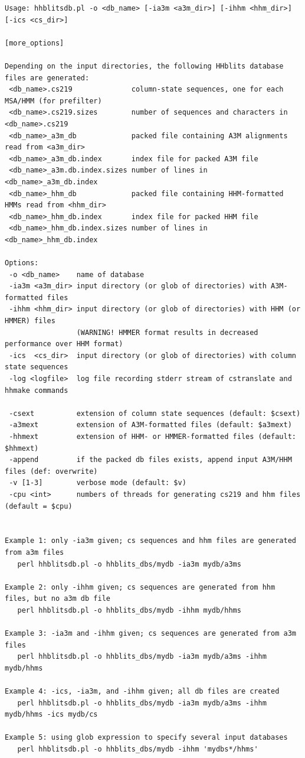 \documentclass[11pt,a4paper]{article}
\begin{document}
\small 
\begin{verbatim}
Usage: hhblitsdb.pl -o <db_name> [-ia3m <a3m_dir>] [-ihhm <hhm_dir>] [-ics <cs_dir>] 
                                                                            [more_options]

Depending on the input directories, the following HHblits database files are generated:
 <db_name>.cs219              column-state sequences, one for each MSA/HMM (for prefilter)
 <db_name>.cs219.sizes        number of sequences and characters in <db_name>.cs219
 <db_name>_a3m_db             packed file containing A3M alignments read from <a3m_dir>
 <db_name>_a3m_db.index       index file for packed A3M file
 <db_name>_a3m.db.index.sizes number of lines in <db_name>_a3m_db.index
 <db_name>_hhm_db             packed file containing HHM-formatted HMMs read from <hhm_dir>
 <db_name>_hhm_db.index       index file for packed HHM file
 <db_name>_hhm_db.index.sizes number of lines in <db_name>_hhm_db.index

Options:
 -o <db_name>    name of database
 -ia3m <a3m_dir> input directory (or glob of directories) with A3M-formatted files
 -ihhm <hhm_dir> input directory (or glob of directories) with HHM (or HMMER) files 
                 (WARNING! HMMER format results in decreased performance over HHM format)
 -ics  <cs_dir>  input directory (or glob of directories) with column state sequences
 -log <logfile>  log file recording stderr stream of cstranslate and hhmake commands

 -csext          extension of column state sequences (default: $csext)
 -a3mext         extension of A3M-formatted files (default: $a3mext)
 -hhmext         extension of HHM- or HMMER-formatted files (default: $hhmext)
 -append         if the packed db files exists, append input A3M/HHM files (def: overwrite)
 -v [1-3]        verbose mode (default: $v)
 -cpu <int>      numbers of threads for generating cs219 and hhm files (default = $cpu)

 
Example 1: only -ia3m given; cs sequences and hhm files are generated from a3m files
   perl hhblitsdb.pl -o hhblits_dbs/mydb -ia3m mydb/a3ms 

Example 2: only -ihhm given; cs sequences are generated from hhm files, but no a3m db file 
   perl hhblitsdb.pl -o hhblits_dbs/mydb -ihhm mydb/hhms 

Example 3: -ia3m and -ihhm given; cs sequences are generated from a3m files
   perl hhblitsdb.pl -o hhblits_dbs/mydb -ia3m mydb/a3ms -ihhm mydb/hhms   

Example 4: -ics, -ia3m, and -ihhm given; all db files are created 
   perl hhblitsdb.pl -o hhblits_dbs/mydb -ia3m mydb/a3ms -ihhm mydb/hhms -ics mydb/cs  

Example 5: using glob expression to specify several input databases
   perl hhblitsdb.pl -o hhblits_dbs/mydb -ihhm 'mydbs*/hhms'  
\end{verbatim} 
\normalsize
\end{document}
